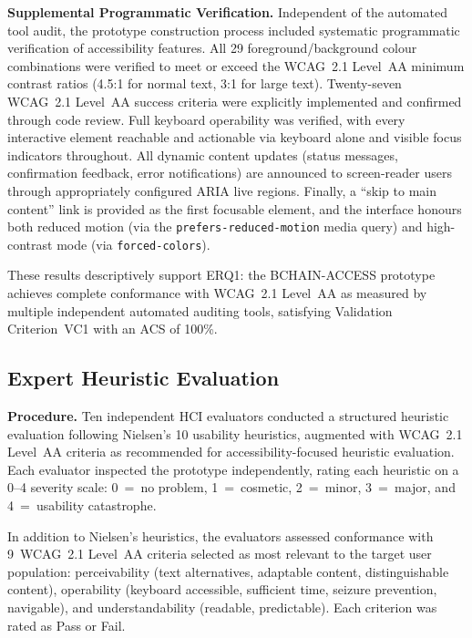 \documentclass[journal,onecolumn]{IEEEtran}
\begin{document}
\textbf{Supplemental Programmatic Verification.} Independent of the
automated tool audit, the prototype construction process included
systematic programmatic verification of accessibility features. All 29 foreground/background colour combinations were verified to meet or exceed the WCAG~2.1 Level~AA minimum contrast ratios (4.5:1 for normal text, 3:1 for large text). Twenty-seven WCAG~2.1 Level~AA success criteria were explicitly implemented and confirmed through code review. Full keyboard operability was verified, with every interactive element reachable and actionable via keyboard alone and visible focus indicators throughout. All dynamic content updates (status messages, confirmation feedback, error notifications) are announced to screen-reader users through appropriately configured ARIA live regions. Finally, a ``skip to main content'' link is provided as the first focusable element, and the interface honours both reduced motion (via the \texttt{prefers-reduced-motion} media query) and high-contrast mode (via \texttt{forced-colors}).

These results descriptively support ERQ1: the BCHAIN-ACCESS prototype
achieves complete conformance with WCAG~2.1 Level~AA as measured by
multiple independent automated auditing tools, satisfying Validation
Criterion~VC1 with an ACS of 100\%.

\subsection{Expert Heuristic Evaluation}
\label{subsec:heuristic-evaluation}

\noindent\textbf{Procedure.} 
Ten independent HCI evaluators conducted a structured
heuristic evaluation following Nielsen's 10 usability
heuristics\cite{nielsen1994usability}, augmented with WCAG~2.1
Level~AA criteria as recommended for accessibility-focused
heuristic evaluation\cite{paz2019heuristic}. Each evaluator
inspected the prototype independently, rating each heuristic on a
0--4 severity scale: 0~=~no problem, 1~=~cosmetic,
2~=~minor, 3~=~major, and 4~=~usability catastrophe.

In addition to Nielsen's heuristics, the evaluators assessed conformance
with 9~WCAG~2.1 Level~AA criteria selected as most relevant to the
target user population: perceivability (text alternatives, adaptable
content, distinguishable content), operability (keyboard accessible,
sufficient time, seizure prevention, navigable), and understandability
(readable, predictable). Each criterion was rated as Pass or Fail.
\end{document}

